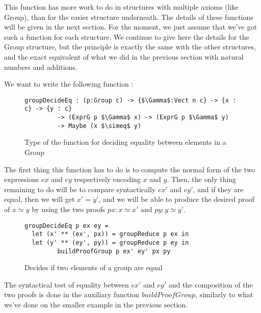 This function has more work to do in structures with multiple axioms (like Group), than for the easier structure underneath.
The details of these functions will be given in the next section. For the moment, we just assume that we've got such a function for each structure. We continue to give here the details for the Group structure, but the principle is exactly the same with the other structures, and the exact equivalent of what we did in the previous section with natural numbers and additions.

We want to write the following function :

\begin{figure}[H]
\figrule
\begin{center}
\begin{lstlisting}
groupDecideEq : (p:Group c) -> {$\Gamma$:Vect n c} -> {x : c} -> {y : c} 
	     -> (ExprG p $\Gamma$ x) -> (ExprG p $\Gamma$ y) 
	     -> Maybe (x $\simeq$ y)
\end{lstlisting}
\end{center}
\caption{Type of the function for deciding equality between elements in a Group}
\figrule
\end{figure}

The first thing this function has to do is to compute the normal form of the two expressions $ex$ and $ey$ respectively encoding $x$ and $y$.
Then, the only thing remaining to do will be to compare syntactically $ex'$ and $ey'$, and if they are equal, then we will get $x'=y'$, and we will be able to produce the desired proof of $x \simeq y$ by using the two proofs $px : x \simeq x'$ and $py : y \simeq y'$. 

\begin{figure}[H]
\figrule
\begin{center}
\begin{lstlisting}
groupDecideEq p ex ey =
  let (x' ** (ex', px)) = groupReduce p ex in
  let (y' ** (ey', py)) = groupReduce p ey in
	     buildProofGroup p ex' ey' px py
\end{lstlisting}
\end{center}
\caption{Decides if two elements of a group are equal}
\figrule
\end{figure}

The syntactical test of equality between $ex'$ and $ey'$ and the composition of the two proofs is done in the auxiliary function $buildProofGroup$, similarly to what we've done on the smaller example in the previous section. 

